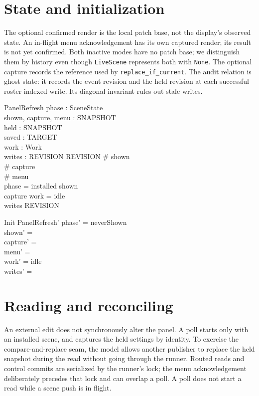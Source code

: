 \documentclass[a4paper,10pt,fleqn]{article}
\begin{document}
\section{State and initialization}

The optional confirmed render is the local patch base, not the
display's observed state. An in-flight menu acknowledgement has its own
captured render; its result is not yet confirmed. Both inactive modes
have no patch base; we
distinguish them by history even though \texttt{LiveScene} represents
both with \texttt{None}. The optional capture records the reference used
by \texttt{replace\_if\_current}. The audit relation is ghost state: it
records the event revision and the held revision at each successful
roster-indexed write. Its diagonal invariant rules out stale writes.

\begin{schema}{PanelRefresh}
  phase : SceneState \\
  shown, capture, menu : \power SNAPSHOT \\
  held : SNAPSHOT \\
  saved : TARGET \\
  work : Work \\
  writes : REVISION \rel REVISION
\where
  \# shown  \\
  \# capture  \\
  \# menu  \\
  phase = installed \iff shown \neq \emptyset \\
  capture \neq \emptyset \implies work = idle \\
  writes \subseteq \id REVISION
\end{schema}

\begin{schema}{Init}
  PanelRefresh'
\where
  phase' = neverShown \\
  shown' = \emptyset \\
  capture' = \emptyset \\
  menu' = \emptyset \\
  work' = idle \\
  writes' = \emptyset
\end{schema}

\section{Reading and reconciling}

An external edit does not synchronously alter the panel. A poll starts
only with an installed scene, and captures the held settings by
identity. To exercise the compare-and-replace seam, the model allows
another publisher to replace the held snapshot during the read without
going through the runner. Routed reads and control commits are
serialized by the runner's lock; the menu acknowledgement deliberately
precedes that lock and can overlap a poll. A poll does not start a read
while a scene push is in flight.
\end{document}
